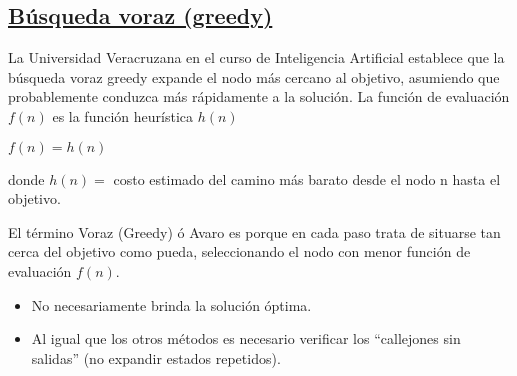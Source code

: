 \documentclass[10pt,conference]{IEEEtran}
\begin{document}
\subsection{\underline{\textbf{Búsqueda voraz (greedy)}}}
La Universidad Veracruzana en el curso de Inteligencia Artificial \citep{vera} establece que la búsqueda voraz greedy expande el nodo más cercano al objetivo, asumiendo que probablemente conduzca más rápidamente a la solución.
La función de evaluación $f(n)$ es la función heurística $h(n)$
\begin{center}
    \par $f(n) = h(n)$
\end{center}
\par donde $h(n) =$ costo estimado del camino más barato desde el nodo n hasta el objetivo.

El término Voraz (Greedy) ó Avaro es porque en cada paso trata de situarse tan cerca del objetivo como pueda, seleccionando el nodo con menor función de evaluación $f(n)$.

\begin{itemize}
\item No necesariamente brinda la solución óptima.
\item Al igual que los otros métodos es necesario verificar los “callejones sin salidas” (no expandir estados repetidos).
\end{itemize}
\end{document}
